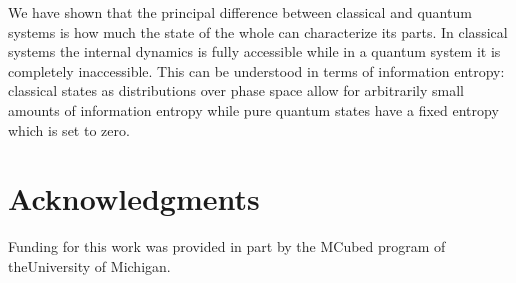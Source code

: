 \documentclass{ws-ijqi}
\begin{document}
We have shown that the principal difference between classical and quantum systems is how much the state of the whole can characterize its parts. In classical systems the internal dynamics is fully accessible while in a quantum system it is completely inaccessible. This can be understood in terms of information entropy: classical states as distributions over phase space allow for arbitrarily small amounts of information entropy while pure quantum states have a fixed entropy which is set to zero.

\section*{Acknowledgments}

 Funding for this work was provided in part by the MCubed program of theUniversity of Michigan.


\renewcommand\bibname{References}



\end{document}
